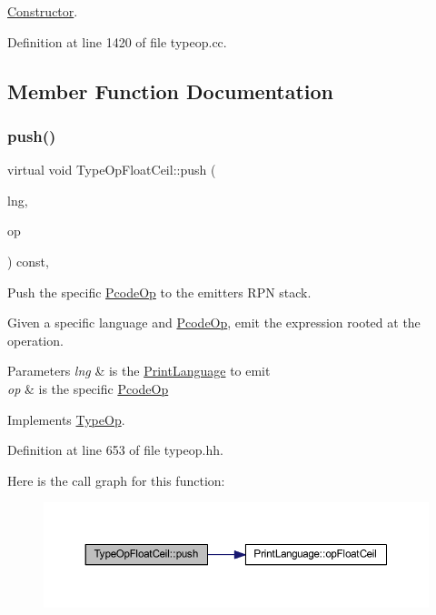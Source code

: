\mbox{\hyperlink{class_constructor}{Constructor}}. 



Definition at line 1420 of file typeop.\+cc.



\subsection{Member Function Documentation}
\mbox{\label{class_type_op_float_ceil_a9cb750e543b0e588ec6d478d4e5f86aa}} 
\subsubsection{\texorpdfstring{push()}{push()}}
{\footnotesize\ttfamily virtual void Type\+Op\+Float\+Ceil\+::push (\begin{DoxyParamCaption}\item[{\mbox{\hyperlink{class_print_language}{Print\+Language}} $\ast$}]{lng,  }\item[{const \mbox{\hyperlink{class_pcode_op}{Pcode\+Op}} $\ast$}]{op }\end{DoxyParamCaption}) const\hspace{0.3cm}{\ttfamily [inline]}, {\ttfamily [virtual]}}



Push the specific \mbox{\hyperlink{class_pcode_op}{Pcode\+Op}} to the emitter\textquotesingle{}s R\+PN stack. 

Given a specific language and \mbox{\hyperlink{class_pcode_op}{Pcode\+Op}}, emit the expression rooted at the operation. 
\begin{DoxyParams}{Parameters}
{\em lng} & is the \mbox{\hyperlink{class_print_language}{Print\+Language}} to emit \\
\hline
{\em op} & is the specific \mbox{\hyperlink{class_pcode_op}{Pcode\+Op}} \\
\hline
\end{DoxyParams}


Implements \mbox{\hyperlink{class_type_op_ac9c9544203ed74dabe6ac662b653b2af}{Type\+Op}}.



Definition at line 653 of file typeop.\+hh.

Here is the call graph for this function\+:
\nopagebreak
\begin{figure}[H]
\begin{center}
\leavevmode
\includegraphics[width=350pt]{class_type_op_float_ceil_a9cb750e543b0e588ec6d478d4e5f86aa_cgraph}
\end{center}
\end{figure}



